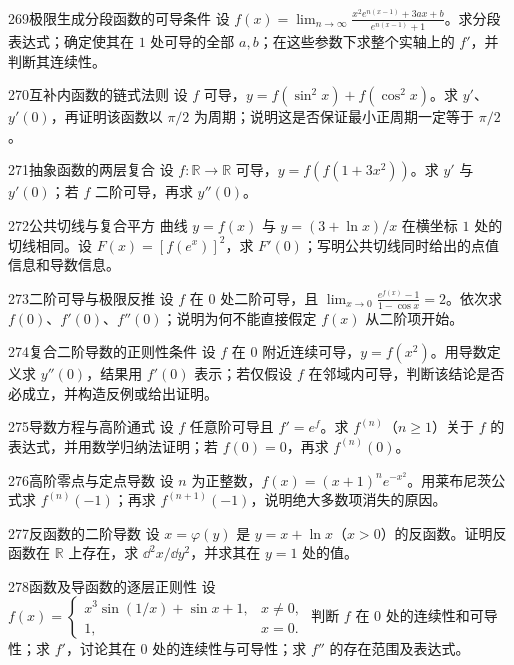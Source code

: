 \begin{exercise}{269}{极限生成分段函数的可导条件}
设 $f(x)=\lim_{n\to\infty}\frac{x^2e^{n(x-1)}+3ax+b}{e^{n(x-1)}+1}$。求分段表达式；确定使其在 $1$ 处可导的全部 $a,b$；在这些参数下求整个实轴上的 $f'$，并判断其连续性。
\end{exercise}
\begin{exercise}{270}{互补内函数的链式法则}
设 $f$ 可导，$y=f(\sin^2x)+f(\cos^2x)$。求 $y'$、$y'(0)$，再证明该函数以 $\pi/2$ 为周期；说明这是否保证最小正周期一定等于 $\pi/2$。
\end{exercise}
\begin{exercise}{271}{抽象函数的两层复合}
设 $f:\mathbb R\to\mathbb R$ 可导，$y=f(f(1+3x^2))$。求 $y'$ 与 $y'(0)$；若 $f$ 二阶可导，再求 $y''(0)$。
\end{exercise}
\begin{exercise}{272}{公共切线与复合平方}
曲线 $y=f(x)$ 与 $y=(3+\ln x)/x$ 在横坐标 $1$ 处的切线相同。设 $F(x)=[f(e^x)]^2$，求 $F'(0)$；写明公共切线同时给出的点值信息和导数信息。
\end{exercise}
\begin{exercise}{273}{二阶可导与极限反推}
设 $f$ 在 $0$ 处二阶可导，且 $\lim_{x\to0}\frac{e^{f(x)}-1}{1-\cos x}=2$。依次求 $f(0)$、$f'(0)$、$f''(0)$；说明为何不能直接假定 $f(x)$ 从二阶项开始。
\end{exercise}
\begin{exercise}{274}{复合二阶导数的正则性条件}
设 $f$ 在 $0$ 附近连续可导，$y=f(x^2)$。用导数定义求 $y''(0)$，结果用 $f'(0)$ 表示；若仅假设 $f$ 在邻域内可导，判断该结论是否必成立，并构造反例或给出证明。
\end{exercise}
\begin{exercise}{275}{导数方程与高阶通式}
设 $f$ 任意阶可导且 $f'=e^f$。求 $f^{(n)}$（$n\ge1$）关于 $f$ 的表达式，并用数学归纳法证明；若 $f(0)=0$，再求 $f^{(n)}(0)$。
\end{exercise}
\begin{exercise}{276}{高阶零点与定点导数}
设 $n$ 为正整数，$f(x)=(x+1)^ne^{-x^2}$。用莱布尼茨公式求 $f^{(n)}(-1)$；再求 $f^{(n+1)}(-1)$，说明绝大多数项消失的原因。
\end{exercise}
\begin{exercise}{277}{反函数的二阶导数}
设 $x=\varphi(y)$ 是 $y=x+\ln x$（$x>0$）的反函数。证明反函数在 $\mathbb R$ 上存在，求 $\dd^2x/\dd y^2$，并求其在 $y=1$ 处的值。
\end{exercise}
\begin{exercise}{278}{函数及导函数的逐层正则性}
设 $f(x)=\begin{cases}x^3\sin(1/x)+\sin x+1,&x\ne0,\\1,&x=0.\end{cases}$ 判断 $f$ 在 $0$ 处的连续性和可导性；求 $f'$，讨论其在 $0$ 处的连续性与可导性；求 $f''$ 的存在范围及表达式。
\end{exercise}
